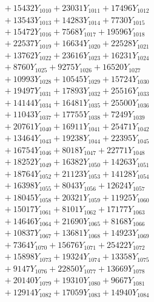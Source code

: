 \documentclass[a4paper,10pt]{article}
\begin{document}
{\begin{align}
&\;  + 15432 Y_{1010} + 23031 Y_{1011} + 17496 Y_{1012} \\[0.3ex]
&\;  + 13543 Y_{1013} + 14283 Y_{1014} + 7730 Y_{1015} \\[0.3ex]
&\;  + 15472 Y_{1016} + 7568 Y_{1017} + 19596 Y_{1018} \\[0.5ex]\allowbreak
&\;  + 22537 Y_{1019} + 16634 Y_{1020} + 22528 Y_{1021} \\[0.3ex]
&\;  + 13762 Y_{1022} + 23616 Y_{1023} + 16231 Y_{1024} \\[0.3ex]
&\;  + 8760 Y_{1025} + 9275 Y_{1026} + 16520 Y_{1027} \\[0.3ex]
&\;  + 10993 Y_{1028} + 10545 Y_{1029} + 15724 Y_{1030} \\[0.3ex]
&\;  + 19497 Y_{1031} + 17893 Y_{1032} + 25516 Y_{1033} \\[0.3ex]
&\;  + 14144 Y_{1034} + 16481 Y_{1035} + 25500 Y_{1036} \\[0.3ex]
&\;  + 11043 Y_{1037} + 17755 Y_{1038} + 7249 Y_{1039} \\[0.3ex]
&\;  + 20761 Y_{1040} + 16911 Y_{1041} + 25471 Y_{1042} \\[0.3ex]
&\;  + 13464 Y_{1043} + 19238 Y_{1044} + 22395 Y_{1045} \\[0.3ex]
&\;  + 16754 Y_{1046} + 8018 Y_{1047} + 22771 Y_{1048} \\[0.5ex]\allowbreak
&\;  + 18252 Y_{1049} + 16382 Y_{1050} + 14263 Y_{1051} \\[0.3ex]
&\;  + 18764 Y_{1052} + 21123 Y_{1053} + 14128 Y_{1054} \\[0.3ex]
&\;  + 16398 Y_{1055} + 8043 Y_{1056} + 12624 Y_{1057} \\[0.3ex]
&\;  + 18045 Y_{1058} + 20321 Y_{1059} + 11925 Y_{1060} \\[0.3ex]
&\;  + 15017 Y_{1061} + 8101 Y_{1062} + 17177 Y_{1063} \\[0.3ex]
&\;  + 14646 Y_{1064} + 21690 Y_{1065} + 8168 Y_{1066} \\[0.3ex]
&\;  + 10837 Y_{1067} + 13681 Y_{1068} + 14923 Y_{1069} \\[0.3ex]
&\;  + 7364 Y_{1070} + 15676 Y_{1071} + 25422 Y_{1072} \\[0.3ex]
&\;  + 15898 Y_{1073} + 19324 Y_{1074} + 13358 Y_{1075} \\[0.3ex]
&\;  + 9147 Y_{1076} + 22850 Y_{1077} + 13669 Y_{1078} \\[0.5ex]\allowbreak
&\;  + 20140 Y_{1079} + 19310 Y_{1080} + 9667 Y_{1081} \\[0.3ex]
&\;  + 12914 Y_{1082} + 17059 Y_{1083} + 14940 Y_{1084} \\[0.3ex]

\end{align}}
\end{document}
